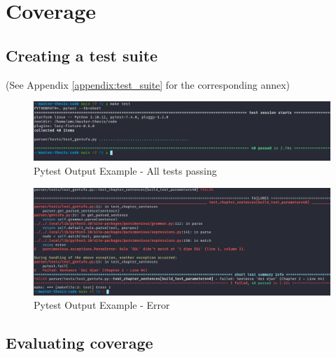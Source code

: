 \chapter{Coverage}

\section{Creating a test suite}
\label{sub:creating_a_test_suite}

(See Appendix \ref{appendix:test_suite} for the corresponding annex)

\begin{figure}[H]
\hspace{-1.1cm}
\includegraphics[scale=0.43]{images/pytest_output_pass.png}
\caption{Pytest Output Example - All tests passing}
\end{figure}

\begin{figure}[H]
\hspace{-2.2cm}
\includegraphics[scale=0.43]{images/pytest_output_fail.png}
\caption{Pytest Output Example - Error}
\end{figure}

\section{Evaluating coverage}